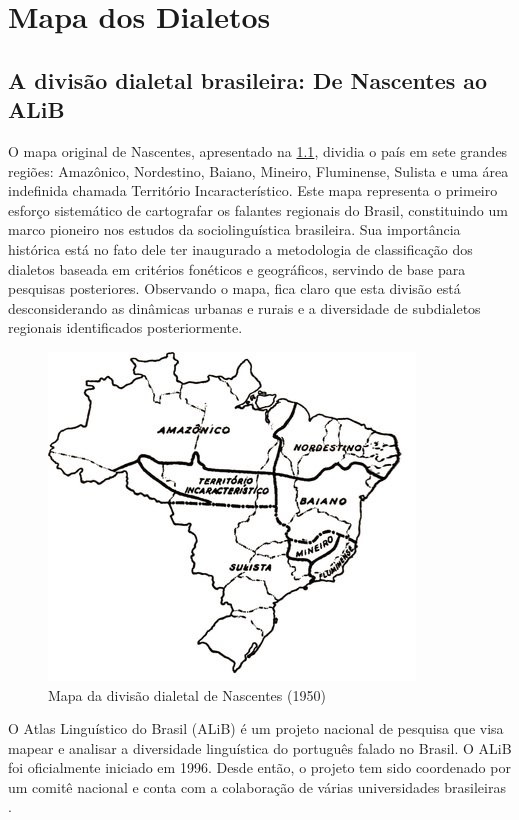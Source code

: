 \chapter{Mapa dos Dialetos}

\section{A divisão dialetal brasileira: De Nascentes ao ALiB}
O mapa original de Nascentes, apresentado na \ref{fig:mapa1950}, dividia o país em sete grandes regiões: Amazônico, Nordestino, Baiano, Mineiro, Fluminense, Sulista e uma área indefinida chamada Território Incaracterístico. Este mapa representa o primeiro esforço sistemático de cartografar os falantes regionais do Brasil, constituindo um marco pioneiro nos estudos da sociolinguística brasileira. Sua importância histórica está no fato dele ter inaugurado a metodologia de classificação dos dialetos baseada em critérios fonéticos e geográficos, servindo de base para pesquisas posteriores. Observando o mapa, fica claro que esta divisão está desconsiderando as dinâmicas urbanas e rurais e a diversidade de subdialetos regionais identificados posteriormente.


\begin{figure}[ht]
  \centering
  \includegraphics[width=0.75\linewidth]{images/mapa_nascentes_1950.jpeg}
  \caption{Mapa da divisão dialetal de Nascentes (1950)}
  \label{fig:mapa1950}
\end{figure}

O Atlas Linguístico do Brasil (ALiB) é um projeto nacional de pesquisa que visa mapear e analisar a diversidade linguística do português falado no Brasil. O ALiB foi oficialmente iniciado em 1996. Desde então, o projeto tem sido coordenado por um comitê nacional e conta com a colaboração de várias universidades brasileiras \cite{Aguilera2022}.

